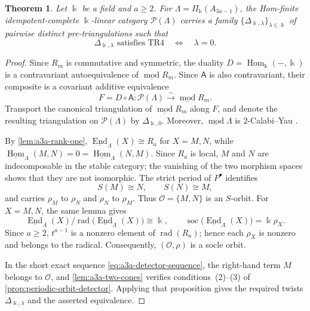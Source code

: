 \documentclass[a4paper,11pt,reqno]{amsart}
\newtheorem{theorem}{Theorem}[section]
\theoremstyle{definition}
\theoremstyle{plain}
\numberwithin{equation}{section}
\newcommand{\Hom}{\operatorname{Hom}}
\newcommand{\End}{\operatorname{End}}
\newcommand{\kk}{\Bbbk}
\begin{document}
\begin{theorem}
\label{thm:scalar-family}
Let \(\kk\) be a field and \(a\ge2\).  For
\(\Lambda=\Pi_\kk(A_{3a-1})\), the Hom-finite idempotent-complete
\(\kk\)-linear category \(\mathcal P(\Lambda)\) carries a family
\(\{\Delta_{\kk,\lambda}\}_{\lambda\in\kk}\) of pairwise distinct
pre-triangulations such that
\[
 \Delta_{\kk,\lambda}\text{ satisfies }\mathrm{TR4}
 \quad\Longleftrightarrow\quad\lambda=0.
\]
\end{theorem}

\begin{proof}
Since \(R_m\) is commutative and symmetric, the duality
\(D=\Hom_\kk(-,\kk)\) is a contravariant autoequivalence of
\(\underline{\operatorname{mod}}R_m\).  Since \(\mathsf A\) is also
contravariant, their composite is a covariant additive equivalence
\[
 F=D\circ\mathsf A:\mathcal P(\Lambda)\xrightarrow{\sim}
 \underline{\operatorname{mod}}R_m.
\]
Transport the canonical triangulation of
\(\underline{\operatorname{mod}}R_m\) along \(F\), and denote the
resulting triangulation on \(\mathcal P(\Lambda)\) by
\(\Delta_{\kk,0}\).  Moreover,
\(\underline{\operatorname{mod}}\Lambda\) is \(2\)-Calabi--Yau
\cite[Section~8.4, Corollary~1, and Section~8.5, Lemma~2]{Keller2005}.

By \cref{lem:a3a-rank-one},
\(\underline{\End}_\Lambda(X)\cong R_a\) for \(X=M,N\), while
\(\underline{\Hom}_\Lambda(M,N)=0=
\underline{\Hom}_\Lambda(N,M)\).  Since \(R_a\) is local, \(M\) and
\(N\) are indecomposable in the stable category; the vanishing of the
two morphism spaces shows that they are not isomorphic.  The strict
period of \(P^\bullet\) identifies
\[
 S(M)\cong N,\qquad S(N)\cong M,
\]
and carries \(\rho_M\) to \(\rho_N\) and \(\rho_N\) to \(\rho_M\).
Thus \(\mathcal O=\{M,N\}\) is an \(S\)-orbit.  For \(X=M,N\), the same
lemma gives
\[
 \underline{\End}_\Lambda(X)/
 \operatorname{rad}\bigl(\underline{\End}_\Lambda(X)\bigr)\cong\kk,
 \qquad
 \operatorname{soc}\bigl(\underline{\End}_\Lambda(X)\bigr)=\kk\rho_X.
\]
Since \(a\ge2\), \(t^{a-1}\) is a nonzero element of
\(\operatorname{rad}(R_a)\); hence each \(\rho_X\) is nonzero and belongs
to the radical.
Consequently, \((\mathcal O,\rho)\) is a socle orbit.

In the short exact sequence \eqref{eq:a3a-detector-sequence}, the
right-hand term \(M\) belongs to \(\mathcal O\), and
\cref{lem:a3a-two-cones} verifies conditions~\textup{(2)}--\textup{(3)}
of \cref{prop:periodic-orbit-detector}.  Applying that proposition gives
the required twists \(\Delta_{\kk,\lambda}\) and the asserted
equivalence.
\end{proof}
\end{document}

